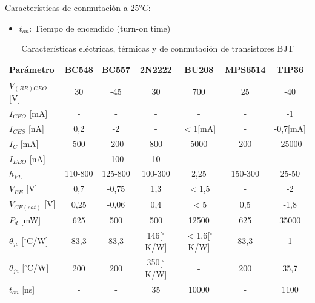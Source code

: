 Características de conmutación a 25$°C$:
        
        \begin{itemize}
            \item $t_{on}$: Tiempo de encendido (turn-on time)
        \end{itemize}

\begin{table}[H]
\centering
\footnotesize
\renewcommand{\arraystretch}{1.3}
\begin{tabular}{|l|c|c|c|c|c|c|}
\hline
\textbf{Parámetro} & \textbf{BC548} & \textbf{BC557} & \textbf{2N2222} & \textbf{BU208} & \textbf{MPS6514} & \textbf{TIP36} \\
\hline
$V_{(BR)CEO}$ [V] & 30 & -45 & 30 & 700 & 25 & -40 \\
$I_{CEO}$ [mA] & - & - & - & - & - &  -1 \\
$I_{CES}$ [nA] & 0,2 & -2 & - & $<$1[mA] & - & -0,7[mA]\\
$I_C$ [mA] & 500 & -200 & 800 & 5000 & 200 & -25000 \\
$I_{EBO}$ [nA] & - & -100 & 10 & - & - & - \\
$h_{FE}$ & 110-800 & 125-800 & 100-300 & 2,25 & 150-300 & 25-50 \\
$V_{BE}$ [V] & 0,7 & -0,75 & 1,3 & $<$1,5 & - & -2 \\
$V_{CE(sat)}$ [V] & 0,25 & -0,06 & 0,4 & $<$5 & 0,5 & -1,8 \\
$P_d$ [mW] & 625 & 500 & 500 & 12500 & 625 & 35000 \\
$\theta_{jc}$ [$^\circ$C/W] & 83,3 & 83,3 & 146[$^\circ$K/W] & $<$1,6[$^\circ$K/W] & 83,3 & 1 \\
$\theta_{ja}$ [$^\circ$C/W] & 200 & 200 & 350[$^\circ$K/W] & - & 200 & 35,7 \\
$t_{on}$ [ns] & - & - & 35 & 10000 & - & 1100\\
\hline
\end{tabular}
\caption{Características eléctricas, térmicas y de conmutación de transistores BJT}
\label{tab:transistores}
\end{table}


\newpage
